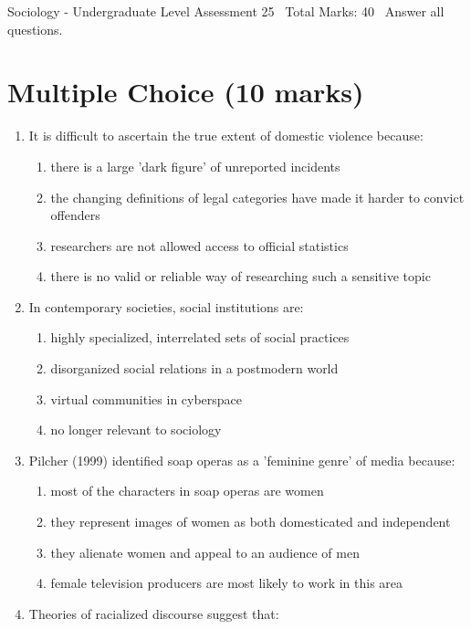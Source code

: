 \documentclass[12pt]{article}
\begin{document}
\begin{center}
Sociology - Undergraduate Level Assessment 25 \
Total Marks: 40 \
Answer all questions.
\end{center}

\section*{Multiple Choice (10 marks)}
\begin{enumerate}[label=\arabic*.]
\item It is difficult to ascertain the true extent of domestic violence because:
\begin{enumerate}[label=(\alph*)]
    \item there is a large 'dark figure' of unreported incidents
    \item the changing definitions of legal categories have made it harder to convict offenders
    \item researchers are not allowed access to official statistics
    \item there is no valid or reliable way of researching such a sensitive topic
\end{enumerate}
\item In contemporary societies, social institutions are:
\begin{enumerate}[label=(\alph*)]
    \item highly specialized, interrelated sets of social practices
    \item disorganized social relations in a postmodern world
    \item virtual communities in cyberspace
    \item no longer relevant to sociology
\end{enumerate}
\item Pilcher (1999) identified soap operas as a 'feminine genre' of media because:
\begin{enumerate}[label=(\alph*)]
    \item most of the characters in soap operas are women
    \item they represent images of women as both domesticated and independent
    \item they alienate women and appeal to an audience of men
    \item female television producers are most likely to work in this area
\end{enumerate}
\item Theories of racialized discourse suggest that:

\end{enumerate}
\end{document}
